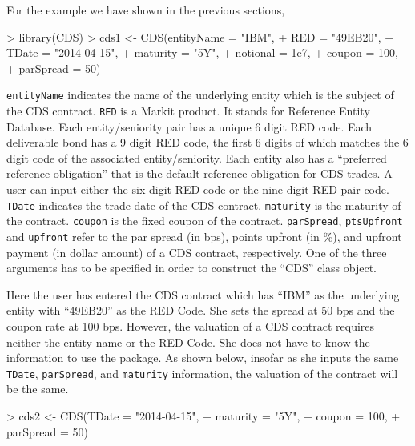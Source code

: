 \documentclass[a4paper]{article}
\begin{document}
For the example we have shown in the previous sections,

\begin{Schunk}
\begin{Sinput}
> library(CDS)
> cds1 <- CDS(entityName = "IBM",
+             RED = "49EB20",
+             TDate = "2014-04-15",
+             maturity = "5Y",
+             notional = 1e7,
+             coupon = 100,
+             parSpread = 50)
\end{Sinput}
\end{Schunk}

\texttt{entityName} indicates the name of the underlying entity which
is the subject of the CDS contract. \texttt{RED} is a Markit
product. It stands for Reference Entity Database. Each
entity/seniority pair has a unique 6 digit RED code. Each deliverable
bond has a 9 digit RED code, the first 6 digits of which matches the 6
digit code of the associated entity/seniority. Each entity also has a
``preferred reference obligation'' that is the default reference
obligation for CDS trades. A user can input either the six-digit RED
code or the nine-digit RED pair code. \texttt{TDate} indicates the
trade date of the CDS contract. \texttt{maturity} is the maturity of
the contract. \texttt{coupon} is the fixed coupon of the
contract. \texttt{parSpread}, \texttt{ptsUpfront} and \texttt{upfront}
refer to the par spread (in bps), points upfront (in \%), and upfront
payment (in dollar amount) of a CDS contract, respectively. One of the
three arguments has to be specified in order to construct the ``CDS''
class object.

Here the user has entered the CDS contract which has ``IBM'' as the
underlying entity with ``49EB20'' as the RED Code. She sets the spread
at 50 bps and the coupon rate at 100 bps. However, the valuation of a
CDS contract requires neither the entity name or the RED Code. She
does not have to know the information to use the package. As shown
below, insofar as she inputs the same \texttt{TDate},
\texttt{parSpread}, and \texttt{maturity} information, the valuation
of the contract will be the same.

\begin{Schunk}
\begin{Sinput}
> cds2 <- CDS(TDate = "2014-04-15",
+             maturity = "5Y",
+             coupon = 100,
+             parSpread = 50)
\end{Sinput}
\end{Schunk}

\end{document}
